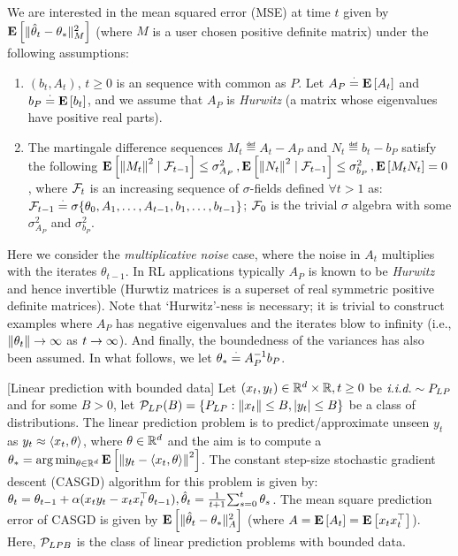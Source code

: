 We are interested in the mean squared error (MSE) at time $t$ given by $\EE{\normsm{\thh_t-\ts}^2_M}$ (where $M$ is a user chosen positive definite matrix) under the following assumptions:
\begin{assumption}\label{assmp:lsa}
\begin{enumerate}[leftmargin=*, before = \leavevmode\vspace{-\baselineskip}]
\item \label{dist} $(b_t, A_t)$, $t\geq 0$ is an \iid sequence with common as $P$. Let $A_P\eqdef\EE{A_t}$ and $b_P\eqdef\EE{b_t}$, and we assume that $A_P$ is \emph{Hurwitz} (a matrix whose eigenvalues have positive real parts).  
\item \label{matvar}  The martingale difference sequences $M_t\eqdef A_t-A_{P}$ and $N_t\eqdef b_t-b_{P}$ satisfy the following 
$\EE{\norm{M_t}^2\mid\F_{t-1}}\leq \sigma^2_{A_P}\,, \EE{\norm{N_t}^2\mid\F_{t-1}} \leq\sigma^2_{b_P}\,, \EE{M_tN_t}=0$,
where $\F_t$ is an increasing sequence of $\sigma$-fields defined $\forall t > 1$ as: $\F_{t-1}\eqdef\sigma\{\theta_0,A_1,\ldots, A_{t-1}, b_1,\ldots, b_{t-1}\}$; $\F_{0}$ is the trivial $\sigma$ algebra with some $\sigma^2_{A_P}$ and $\sigma^2_{b_P}$. 
\end{enumerate}
\end{assumption}
Here we consider the \emph{multiplicative noise} case, where the noise in $A_t$ multiplies with the iterates $\theta_{t-1}$. In RL applications typically $A_P$ is known to be \emph{Hurwitz} and hence invertible (Hurwtiz matrices is a superset of real symmetric positive definite matrices). Note that `Hurwitz'-ness is necessary; it is trivial to construct examples where $A_P$ has negative eigenvalues and the iterates blow to infinity (i.e., $\norm{\theta_t}\ra\infty$ as $t\ra\infty$). %
And finally, the boundedness of the variances has also been assumed. In what follows, we let $\ts\eqdef A_P^{-1}b_P$.
\begin{example}\label{ex:linpred}[Linear prediction with bounded data]
Let $(x_t,y_t)\in \R^{d}\times \R, t\geq 0$ be $\iid \sim P_{LP}$ and for some $B>0$, let $\P_{LP}(B)=\{  P_{LP}: \norm{x_t}\leq B, \md{y_t}\leq B \}$ be a class of distributions. The linear prediction problem is to predict/approximate unseen $y_t$ as $y_t\approx \ip{x_t,\theta}$, where $\theta\in\R^d$ and the aim is to compute a $\ts=\arg\min_{\theta\in\R^d} \EE{\norm{y_t-\ip{x_t,\theta}}^2}$. The constant step-size stochastic gradient descent (CASGD) algorithm for this problem is given by: $
\theta_t=\theta_{t-1}+\alpha(x_t y_t-x_tx_t^\top\theta_{t-1}), \thh_t=\frac{1}{t+1}{\sum}_{s=0}^{t}\,\theta_s$. The mean square prediction error of CASGD is given by $\EE{\normsm{\thh_t-\ts}^2_A}$ (where $A=\EE{A_t}=\EE{x_tx_t^\top}$). Here, $\P_{LPB}$ is the class of linear prediction problems with bounded data.
\end{example}
